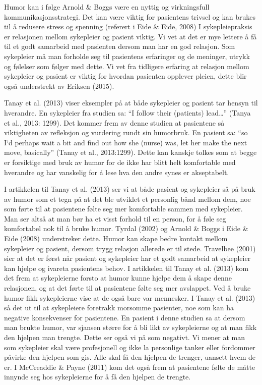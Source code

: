Humor kan i følge Arnold \&{} Boggs være en nyttig og virkningsfull
kommunikasjonsstrategi. Det kan være viktig for pasientens trivsel og kan
brukes til å redusere stress og spenning (referert i Eide \&{} Eide, 2008) I
sykepleiepraksis er relasjonen mellom sykepleier og pasient viktig. Vi vet at
det er mye lettere å få til et godt samarbeid med pasienten dersom man har en
god relasjon. Som sykepleier må man forholde seg til pasientens erfaringer og
de meninger, utrykk og følelser som følger med dette. Vi vet fra tidligere
erfaring at relasjon mellom sykepleier og pasient er viktig for hvordan
pasienten opplever pleien, dette blir også understrekt av Eriksen (2015).

Tanay et al. (2013) viser eksempler på at både sykepleier og pasient tar hensyn
til hverandre. En sykepleier fra studien sa: “I follow their (patients) lead…”
(Tanya et al., 2013: 1299). Det kommer frem av denne studien at pasientene så
viktigheten av refleksjon og vurdering rundt sin humorbruk. En pasient sa: “so
I`d perhaps wait a bit and find out how she (nurse) was, let her make the next
move, basically” (Tanay et al., 2013:1299).  Dette kan kanskje tolkes som at
begge er forsiktige med bruk av humor for de ikke har blitt helt komfortable
med hverandre og har vanskelig for å lese hva den andre synes er akseptabelt.

I artikkelen til Tanay et al. (2013) ser vi at både pasient og sykepleier så på
bruk av humor som et tegn på at det ble utviklet et personlig bånd mellom dem,
noe som førte til at pasientene følte seg mer komfortable sammen med
sykepleier. Man ser altså at man bør ha et visst forhold til en person, for å
føle seg komfortabel nok til å bruke humor. Tyrdal (2002) og Arnold \&{} Boggs i
Eide \&{} Eide (2008) understreker dette. Humor kan skape bedre kontakt mellom
sykepleier og pasient, dersom trygg relasjon allerede er til stede.  Travelbee
(2001) sier at det er først når pasient og sykepleier har et godt samarbeid at
sykepleier kan hjelpe og ivareta pasientens behov. I artikkelen til Tanay et
al. (2013) kom det frem at sykepleierne forsto at humor kunne hjelpe dem å
skape denne relasjonen, og at det førte til at pasientene følte seg mer
avslappet. Ved å bruke humor fikk sykepleierne vise at de også bare var
mennesker.  I Tanay et al. (2013) så det ut til at sykepleiere foretrakk
morsomme pasienter, noe som kan ha negative konsekvenser for pasientene. En
pasient i denne studien sa at dersom man brukte humor, var sjansen større for å
bli likt av sykepleierne og at man fikk den hjelpen man trengte. Dette ser også
vi på som negativt. Vi mener at man som sykepleier skal være profesjonell og
ikke la personlige tanker eller fordommer påvirke den hjelpen som gis. Alle
skal få den hjelpen de trenger, uansett hvem de er. I McCreaddie \&{} Payne (2011)
kom det også frem at pasientene følte de måtte innynde seg hos sykepleierne for
å få den hjelpen de trengte.

